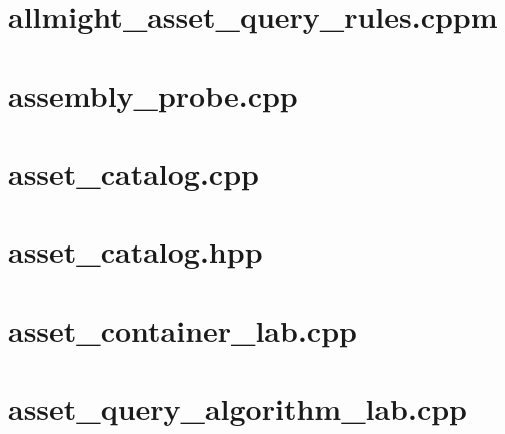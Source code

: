 \documentclass[11pt,twoside,openany]{book}
\begin{document}
\section*{allmight\_asset\_query\_rules.cppm}
\hypertarget{source-file-eab7d4e282f0926fda89ab31}{}
\label{attachmentstart:source-file-eab7d4e282f0926fda89ab31}
\section*{assembly\_probe.cpp}
\hypertarget{source-file-04abded74b7e03edc5dcf870}{}
\label{attachmentstart:source-file-04abded74b7e03edc5dcf870}
\section*{asset\_catalog.cpp}
\hypertarget{source-file-0529c78555b675a2ae111228}{}
\label{attachmentstart:source-file-0529c78555b675a2ae111228}
\section*{asset\_catalog.hpp}
\hypertarget{source-file-e829cf731b17419e282775cf}{}
\label{attachmentstart:source-file-e829cf731b17419e282775cf}
\section*{asset\_container\_lab.cpp}
\hypertarget{source-file-c479bd493444d093f6c34898}{}
\label{attachmentstart:source-file-c479bd493444d093f6c34898}
\section*{asset\_query\_algorithm\_lab.cpp}
\hypertarget{source-file-a1c76c44bc377537c732f5c4}{}
\label{attachmentstart:source-file-a1c76c44bc377537c732f5c4}
\end{document}
